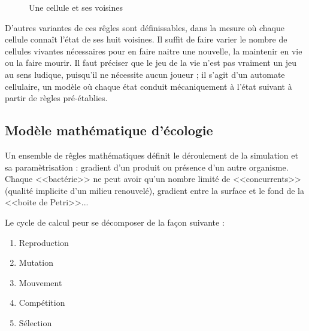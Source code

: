 \documentclass[11pt,twoside,a4paper]{article}
\begin{document}
\begin{figure}[H]
	\centerline {}
	\caption{Une cellule et ses voisines}
	\label{fig:cellneighboor}
\end{figure}

D'autres variantes de ces r{\^e}gles sont d{\'e}finissables, dans la mesure o{\`u} chaque cellule connaît l'{\'e}tat de ses huit voisines. Il suffit de faire varier le nombre de cellules vivantes n{\'e}cessaires pour en faire naitre une nouvelle, la maintenir en vie ou la faire mourir. Il faut pr{\'e}ciser que le jeu de la vie n'est pas vraiment un jeu au sens ludique, puisqu'il ne n{\'e}cessite aucun joueur ; il s'agit d'un automate cellulaire, un mod{\`e}le o{\`u} chaque {\'e}tat conduit m{\'e}caniquement {\`a} l'{\'e}tat suivant {\`a} partir de r{\`e}gles pr{\'e}-{\'e}tablies.~\\

\clearpage

\subsection{Mod{\`e}le math{\'e}matique d'{\'e}cologie}

\begin{minipage}{0.5\linewidth}
Un ensemble de r{\^e}gles math{\'e}matiques d{\'e}finit le d{\'e}roulement de la simulation et sa param{\`e}trisation : gradient d'un produit ou pr{\'e}sence d'un autre organisme. Chaque <<bact{\'e}rie>> ne peut avoir qu'un nombre limit{\'e} de <<concurrents>> (qualit{\'e} implicite d'un milieu renouvel{\'e}), gradient entre la surface et le fond de la <<boite de Petri>>...
\end{minipage}
\begin{minipage}{0.1\linewidth}\end{minipage}
\begin{minipage}{0.4\linewidth}
Le cycle de calcul peur se d{\'e}composer de la fa\c{c}on suivante :
\begin{enumerate}
	\item Reproduction
	\item Mutation
	\item Mouvement
	\item Comp{\'e}tition
	\item S{\'e}lection
\end{enumerate}
\end{minipage}~\\
\end{document}
